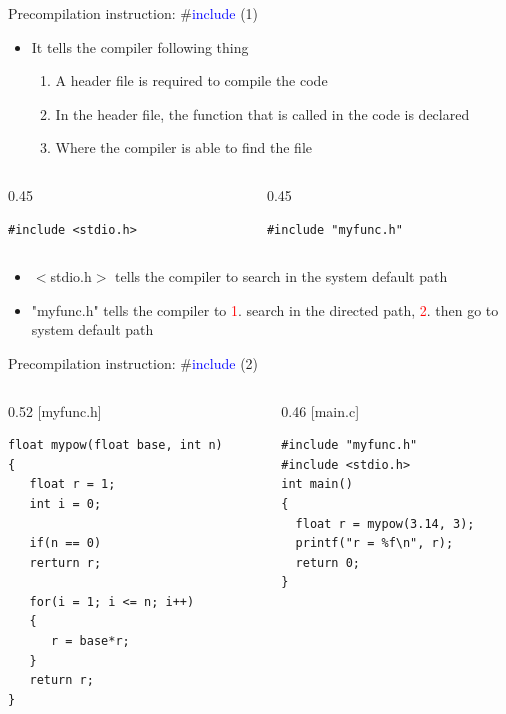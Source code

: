\begin{frame}[fragile]{Precompilation instruction: \#\textcolor{blue}{include} (1)}
\begin{itemize}
	\item {It tells the compiler following thing}
	\begin{enumerate}
		\item {A header file is required to compile the code}
		\item {In the header file, the function that is called in the code is declared}
		\item {Where the compiler is able to find the file}
	\end{enumerate}
\end{itemize}
\begin{columns}
\begin{column}{0.45\linewidth}
\begin{lstlisting}
#include <stdio.h>

\end{lstlisting}
\end{column}
\begin{column}{0.45\linewidth}
\begin{lstlisting}
#include "myfunc.h"

\end{lstlisting}
\end{column}
\end{columns}
\begin{itemize}
	\item {$<$stdio.h$>$ tells the compiler to search in the system default path}
	\item {"myfunc.h" tells the compiler to \textcolor{red}{1}. search in the directed path, \textcolor{red}{2}. then go to system default path}
\end{itemize}
\end{frame}

\begin{frame}[fragile]{Precompilation instruction: \#\textcolor{blue}{include} (2)}
\begin{columns}
\begin{column}{0.52\linewidth}
[myfunc.h]
\begin{lstlisting}[linewidth=0.95\linewidth]
float mypow(float base, int n)
{
   float r = 1;
   int i = 0;
   
   if(n == 0)
   rerturn r;
   
   for(i = 1; i <= n; i++)
   {
      r = base*r;
   }
   return r;
}
\end{lstlisting}
\end{column}
\begin{column}{0.46\linewidth}
[main.c]
\begin{lstlisting}
#include "myfunc.h"
#include <stdio.h>
int main()
{
  float r = mypow(3.14, 3);
  printf("r = %f\n", r);
  return 0;
}
\end{lstlisting}
\end{column}
\end{columns}
\end{frame}

